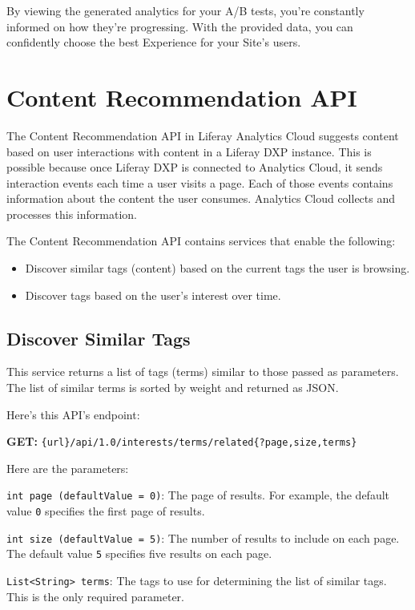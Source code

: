By viewing the generated analytics for your A/B tests, you're constantly
informed on how they're progressing. With the provided data, you can
confidently choose the best Experience for your Site's users.

\section{Content Recommendation API}\label{content-recommendation-api}

The Content Recommendation API in Liferay Analytics Cloud suggests
content based on user interactions with content in a Liferay DXP
instance. This is possible because once Liferay DXP is connected to
Analytics Cloud, it sends interaction events each time a user visits a
page. Each of those events contains information about the content the
user consumes. Analytics Cloud collects and processes this information.

The Content Recommendation API contains services that enable the
following:

\begin{itemize}
\tightlist
\item
  Discover similar tags (content) based on the current tags the user is
  browsing.
\item
  Discover tags based on the user's interest over time.
\end{itemize}

\subsection{Discover Similar Tags}\label{discover-similar-tags}

This service returns a list of tags (terms) similar to those passed as
parameters. The list of similar terms is sorted by weight and returned
as JSON.

Here's this API's endpoint:

\textbf{GET:}
\texttt{\{url\}/api/1.0/interests/terms/related\{?page,size,terms\}}

Here are the parameters:

\texttt{int\ page\ (defaultValue\ =\ 0)}: The page of results. For
example, the default value \texttt{0} specifies the first page of
results.

\texttt{int\ size\ (defaultValue\ =\ 5)}: The number of results to
include on each page. The default value \texttt{5} specifies five
results on each page.

\texttt{List\textless{}String\textgreater{}\ terms}: The tags to use for
determining the list of similar tags. This is the only required
parameter.

